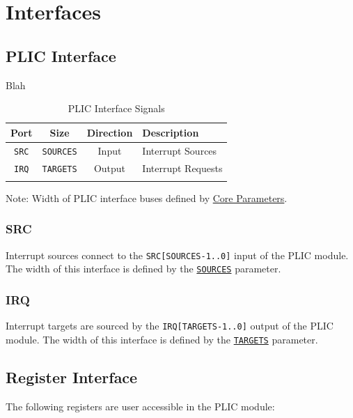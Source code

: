 \section{Interfaces}



\subsection{PLIC Interface}

Blah

\begin{longtable}[]{@{}cccl@{}}
\toprule
\textbf{Port} & \textbf{Size} & \textbf{Direction} &
\textbf{Description}\tabularnewline
\midrule
\endhead
\texttt{SRC} & \texttt{SOURCES} & Input & Interrupt
Sources\tabularnewline
\texttt{IRQ} & \texttt{TARGETS} & Output & Interrupt
Requests\tabularnewline
\bottomrule
\caption{PLIC Interface Signals}
\label{tab:PLICIF}
\end{longtable}

Note: Width of PLIC interface buses defined by
\protect\hyperlink{core-parameters}{Core Parameters}.

\subsubsection{SRC}

Interrupt sources connect to the \texttt{SRC{[}SOURCES-1..0{]}} input of
the PLIC module. The width of this interface is defined by the
\protect\hyperlink{SOURCES}{\texttt{SOURCES}} parameter.

\subsubsection{IRQ}

Interrupt targets are sourced by the \texttt{IRQ{[}TARGETS-1..0{]}}
output of the PLIC module. The width of this interface is defined by the
\protect\hyperlink{TARGETS}{\texttt{TARGETS}} parameter.

\subsection{Register Interface}

The following registers are user accessible in the PLIC module:


